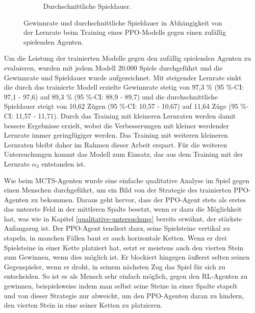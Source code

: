 \begin{figure}[ht!]
\begin{subfigure}[b]{0.48\textwidth}
		\caption{Durchschnittliche Spieldauer.}
		\label{fig:f22}
	\end{subfigure}
	\caption{Gewinnrate und durchschnittliche Spieldauer in Abhängigkeit von der Lernrate beim Training eines PPO-Modells gegen einen zufällig spielenden Agenten.}
\end{figure}

Um die Leistung der trainierten Modelle gegen den zufällig spielenden Agenten zu evaluieren, wurden mit jedem Modell 20.000 Spiele durchgeführt und die Gewinnrate und Spieldauer wurde aufgezeichnet. Mit steigender Lernrate sinkt die durch das trainierte Modell erzielte Gewinnrate stetig von 97,3 \% (95 \%-CI: 97,1 - 97,6) auf 89,3 \% (95 \%-CI: 88,9 - 89,7) und die durchschnittliche Spieldauer steigt von 10,62 Zügen (95 \%-CI: 10,57 - 10,67) auf 11,64 Züge (95 \%-CI: 11,57 - 11,71). Durch das Training mit kleineren Lernraten werden damit bessere Ergebnisse erzielt, wobei die Verbesserungen mit kleiner werdender Lernrate immer geringfügiger werden. Das Training mit weiteren kleineren Lernraten bleibt daher im Rahmen dieser Arbeit erspart. Für die weiteren Untersuchungen kommt das Modell zum Einsatz, das aus dem Training mit der Lernrate $\alpha_3$ entstanden ist.

Wie beim MCTS-Agenten wurde eine einfache qualitative Analyse im Spiel gegen einen Menschen durchgeführt, um ein Bild von der Strategie des trainierten PPO-Agenten zu bekommen. Daraus geht hervor, dass der PPO-Agent stets als erstes das unterste Feld in der mittleren Spalte besetzt, wenn er dazu die Möglichkeit hat, was wie in Kapitel \ref{qualitative-untersuchung} bereits erwähnt, der stärkste Anfangszug ist. Der PPO-Agent tendiert dazu, seine Spielsteine vertikal zu stapeln, in manchen Fällen baut er auch horizontale Ketten. Wenn er drei Spielsteine in einer Kette platziert hat, setzt er meistens auch den vierten Stein zum Gewinnen, wenn dies möglich ist. Er blockiert hingegen äußerst selten seinen Gegenspieler, wenn er droht, in seinem nächsten Zug das Spiel für sich zu entscheiden. So ist es als Mensch sehr einfach möglich, gegen den RL-Agenten zu gewinnen, beispielsweise indem man selbst seine Steine in einer Spalte stapelt und von dieser Strategie nur abweicht, um den PPO-Agenten daran zu hindern, den vierten Stein in eine seiner Ketten zu platzieren.

